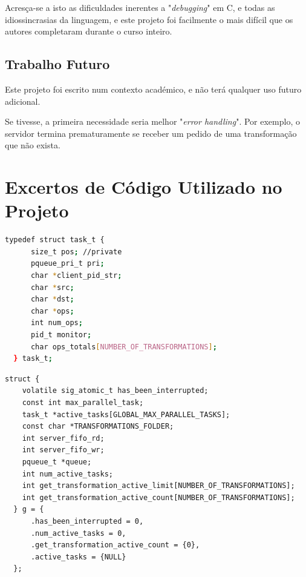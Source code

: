 \documentclass[11pt,a4paper]{report}%
\begin{document}
Acresça-se a isto as dificuldades inerentes a "\textit{debugging}" em C, e todas as idiossincrasias da
linguagem, e este projeto foi facilmente o mais difícil que os autores completaram durante o curso inteiro.

\section{Trabalho Futuro}

Este projeto foi escrito num contexto académico, e não terá qualquer uso futuro adicional.

Se tivesse, a primeira necessidade seria melhor "\textit{error handling}".
Por exemplo, o servidor termina prematuramente se receber um pedido de uma transformação que
não exista.

\appendix %
\chapter{Excertos de Código Utilizado no Projeto}


\label{code:task_struct}
\begin{lstlisting}[language=bash, caption={Estrutura para pedidos de processamento de ficheiros}]
    typedef struct task_t {
      size_t pos; //private
      pqueue_pri_t pri;
      char *client_pid_str;
      char *src;
      char *dst;
      char *ops;
      int num_ops;
      pid_t monitor;
      char ops_totals[NUMBER_OF_TRANSFORMATIONS];
  } task_t;
\end{lstlisting}

\label{code:server_struct}
\begin{lstlisting}[caption={Amostra de Estrutura global do servidor}]
  struct {
    volatile sig_atomic_t has_been_interrupted;
    const int max_parallel_task;
    task_t *active_tasks[GLOBAL_MAX_PARALLEL_TASKS];
    const char *TRANSFORMATIONS_FOLDER;
    int server_fifo_rd;
    int server_fifo_wr;
    pqueue_t *queue;
    int num_active_tasks;
    int get_transformation_active_limit[NUMBER_OF_TRANSFORMATIONS];
    int get_transformation_active_count[NUMBER_OF_TRANSFORMATIONS];
  } g = {
      .has_been_interrupted = 0,
      .num_active_tasks = 0,
      .get_transformation_active_count = {0},
      .active_tasks = {NULL}
  };
\end{lstlisting}
\end{document}

